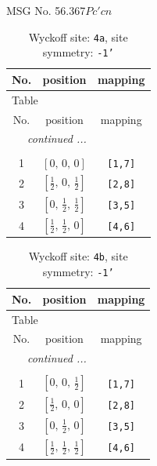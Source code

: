 \documentclass[fleqn,8pt]{jsarticle}
\begin{document}
\setcounter{MaxMatrixCols}{32}

\renewcommand{\tablename}{Table~}
\renewcommand{\figurename}{Figure~}
\begin{center}
\LARGE
MSG No. 56.367\quad$Pc'cn$
\end{center}
\renewcommand{\arraystretch}{1.2}
\begin{longtable}{ccc}
\caption{Wyckoff site: {\tt 4a}, site symmetry: {\tt -1'}}
 \\
 \hline \hline
No. & position & mapping \\ \hline \endfirsthead

\multicolumn{2}{l}{\tablename\ \thetable{}} \\
 \hline \hline
No. & position & mapping \\ \hline \endhead

 \hline \hline
\multicolumn{2}{r}{\footnotesize\it continued ...} \\ \endfoot

 \hline \hline
\multicolumn{2}{r}{} \\ \endlastfoot

1 & $\left[ 0,\, 0,\, 0 \right]$ & {\tt [1,7]} \\ \hline
2 & $\left[ \frac{1}{2},\, 0,\, \frac{1}{2} \right]$ & {\tt [2,8]} \\ \hline
3 & $\left[ 0,\, \frac{1}{2},\, \frac{1}{2} \right]$ & {\tt [3,5]} \\ \hline
4 & $\left[ \frac{1}{2},\, \frac{1}{2},\, 0 \right]$ & {\tt [4,6]} \\
\end{longtable}
\renewcommand{\arraystretch}{1.2}
\begin{longtable}{ccc}
\caption{Wyckoff site: {\tt 4b}, site symmetry: {\tt -1'}}
 \\
 \hline \hline
No. & position & mapping \\ \hline \endfirsthead

\multicolumn{2}{l}{\tablename\ \thetable{}} \\
 \hline \hline
No. & position & mapping \\ \hline \endhead

 \hline \hline
\multicolumn{2}{r}{\footnotesize\it continued ...} \\ \endfoot

 \hline \hline
\multicolumn{2}{r}{} \\ \endlastfoot

1 & $\left[ 0,\, 0,\, \frac{1}{2} \right]$ & {\tt [1,7]} \\ \hline
2 & $\left[ \frac{1}{2},\, 0,\, 0 \right]$ & {\tt [2,8]} \\ \hline
3 & $\left[ 0,\, \frac{1}{2},\, 0 \right]$ & {\tt [3,5]} \\ \hline
4 & $\left[ \frac{1}{2},\, \frac{1}{2},\, \frac{1}{2} \right]$ & {\tt [4,6]} \\
\end{longtable}
\end{document}
